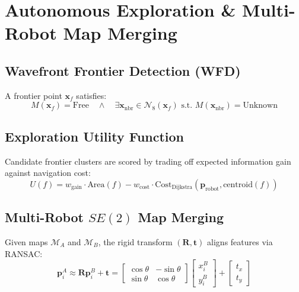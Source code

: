 \documentclass[10pt,a4paper]{article}
\begin{document}
\section{Autonomous Exploration \& Multi-Robot Map Merging}

\subsection{Wavefront Frontier Detection (WFD)}
A frontier point $\mathbf{x}_f$ satisfies:
\begin{equation}
M(\mathbf{x}_f) = \text{Free} \quad \wedge \quad \exists \mathbf{x}_{\text{nbr}} \in \mathcal{N}_8(\mathbf{x}_f) \text{ s.t. } M(\mathbf{x}_{\text{nbr}}) = \text{Unknown}
\end{equation}

\subsection{Exploration Utility Function}
Candidate frontier clusters are scored by trading off expected information gain against navigation cost:
\begin{equation}
U(f) = w_{\text{gain}} \cdot \text{Area}(f) - w_{\text{cost}} \cdot \text{Cost}_{\text{Dijkstra}}(\mathbf{p}_{\text{robot}}, \text{centroid}(f))
\end{equation}

\subsection{Multi-Robot $SE(2)$ Map Merging}
Given maps $\mathcal{M}_A$ and $\mathcal{M}_B$, the rigid transform $(\mathbf{R}, \mathbf{t})$ aligns features via RANSAC:
\begin{equation}
\mathbf{p}_i^A \approx \mathbf{R} \mathbf{p}_i^B + \mathbf{t} = \begin{bmatrix} \cos\theta & -\sin\theta \\ \sin\theta & \cos\theta \end{bmatrix} \begin{bmatrix} x_i^B \\ y_i^B \end{bmatrix} + \begin{bmatrix} t_x \\ t_y \end{bmatrix}
\end{equation}
\end{document}
